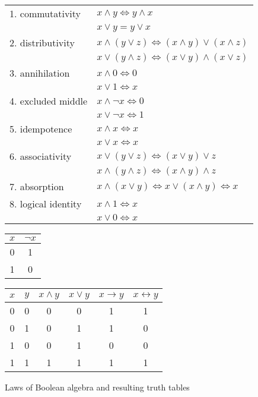 \begin{figure}
\centering
\begin{tabular}{|ll|}
\hline
1. commutativity & $x \land y \Leftrightarrow y \land x$ \\ 
  & $x \lor y = y \lor x$ \\
2. distributivity & 
   $x \land (y \lor z) \Leftrightarrow (x \land y) \lor (x \land z)$ \\
 & $x \lor (y \land z) \Leftrightarrow (x \lor y) \land (x \lor z)$ \\
3. annihilation & $x \land 0 \Leftrightarrow 0$ \\
  & $x \lor 1 \Leftrightarrow x$ \\
4. excluded middle & $x \land \lnot x \Leftrightarrow 0$ \\
  & $x \lor \lnot x \Leftrightarrow 1$ \\
5. idempotence   & $x \land x \Leftrightarrow x$ \\
  & $x \lor x \Leftrightarrow x$ \\
6. associativity & $x \lor (y \lor z) \Leftrightarrow (x \lor y) \lor z$ \\
  &  $x \land (y \land z) \Leftrightarrow (x \land y) \land z$ \\
7. absorption
  & $x \land (x \lor y) \Leftrightarrow x \lor (x \land y) \Leftrightarrow x$ \\
8. logical identity & $x \land 1 \Leftrightarrow x$ \\
  & $x \lor 0 \Leftrightarrow x$ \\
\hline
\end{tabular}

\begin{tabular}{|c|c|}
\hline
$x$ & $\lnot x$ \\
\hline
0 & 1 \\
1 & 0 \\
\hline
\end{tabular}
\begin{tabular}{|cc|cccc|}
\hline
$x$ & $y$ & $x \land y$ & $x \lor y$ &
$x \to y$ & $x \leftrightarrow y$ \\
\hline
0 & 0 & 0 & 0 & 1 & 1 \\
0 & 1 & 0 & 1 & 1 & 0 \\
1 & 0 & 0 & 1 & 0 & 0 \\
1 & 1 & 1 & 1 & 1 & 1 \\
\hline
\end{tabular}
\caption{Laws of Boolean algebra and resulting truth tables}
\label{fig:truthtables}
\end{figure}

